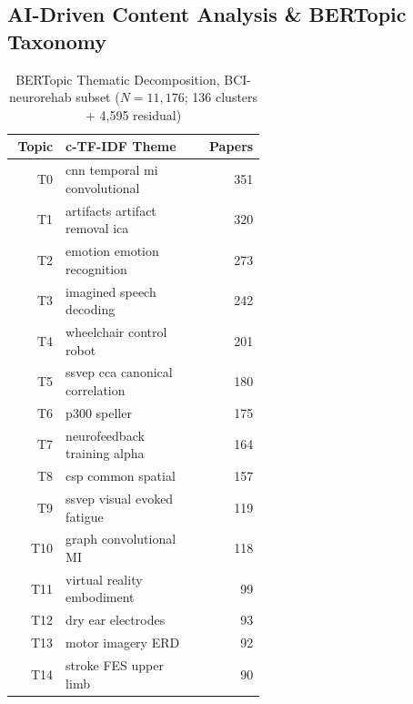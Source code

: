 \subsection{AI-Driven Content Analysis \& BERTopic Taxonomy}
\begin{table}[htbp]
\caption{BERTopic Thematic Decomposition, BCI-neurorehab subset ($N=11{,}176$; 136 clusters + 4,595 residual)}
\label{tab:bertopic_clusters}
\scriptsize
\begin{tabular}{r p{0.55\linewidth} r}
\toprule
\textbf{Topic} & \textbf{c-TF-IDF Theme} & \textbf{Papers} \\
\midrule
T0 & cnn temporal mi convolutional & 351 \\
T1 & artifacts artifact removal ica & 320 \\
T2 & emotion emotion recognition & 273 \\
T3 & imagined speech decoding & 242 \\
T4 & wheelchair control robot & 201 \\
T5 & ssvep cca canonical correlation & 180 \\
T6 & p300 speller & 175 \\
T7 & neurofeedback training alpha & 164 \\
T8 & csp common spatial & 157 \\
T9 & ssvep visual evoked fatigue & 119 \\
T10 & graph convolutional MI & 118 \\
T11 & virtual reality embodiment & 99 \\
T12 & dry ear electrodes & 93 \\
T13 & motor imagery ERD & 92 \\
T14 & stroke FES upper limb & 90 \\
\bottomrule
\end{tabular}
\end{table}
